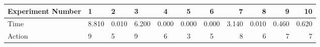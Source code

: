 \documentclass[8pt]{article}
\begin{document}
\begin{landscape}
\begin{tabular}{ | l | l | l | l | c | c | c | r | r | r | r | }
 \hline 
Experiment Number & 1 & 2 & 3 & 4 & 5 & 6 & 7 & 8 & 9 & 10\\ \hline
Time & 8.810 & 0.010 & 6.200 & 0.000 & 0.000 & 0.000 & 3.140 & 0.010 & 0.460 & 0.620\\ \hline
Action & 9 & 5 & 9 & 6 & 3 & 5 & 8 & 6 & 7 & 7\\ \hline\end{tabular}
\end{landscape}
\end{document}
